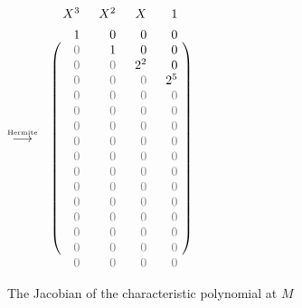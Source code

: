 \documentclass[11pt]{article}
\numberwithin{equation}{section}
\numberwithin{figure}{section}
\theoremstyle{definition}
\begin{document}
\begin{figure}
{\quad $\stackrel{\text{\tiny Hermite}}{\longrightarrow}$ \quad
$\begin{array}{c@{}r@{\hspace{1.5em}}r@{\hspace{1.5em}}r@{\hspace{1.5em}}r@{\hspace{0.5ex}}c}
& X^3 & X^2 & X & 1 \\
\rule[3ex]{0pt}{\baselineskip}
\raisebox{0.2ex}{\multirow{16}{*}{$\left(\parbox[c][39ex]{0cm}{}\right.$}}
& 1 & 0 & 0 & 0 &
\raisebox{0.2ex}{\multirow{16}{*}{$\left.\parbox[c][39ex]{0cm}{}\right)$}} \\
&{\color{black!50} 0} & 1 & 0 & 0 \\
&{\color{black!50} 0} & {\color{black!50} 0} & 2^2 & 0 \\
&{\color{black!50} 0} & {\color{black!50} 0} & {\color{black!50} 0} & 2^5 \\
&{\color{black!50} 0} & {\color{black!50} 0} & {\color{black!50} 0} & {\color{black!50} 0} \\
&{\color{black!50} 0} & {\color{black!50} 0} & {\color{black!50} 0} & {\color{black!50} 0} \\
&{\color{black!50} 0} & {\color{black!50} 0} & {\color{black!50} 0} & {\color{black!50} 0} \\
&{\color{black!50} 0} & {\color{black!50} 0} & {\color{black!50} 0} & {\color{black!50} 0} \\
&{\color{black!50} 0} & {\color{black!50} 0} & {\color{black!50} 0} & {\color{black!50} 0} \\
&{\color{black!50} 0} & {\color{black!50} 0} & {\color{black!50} 0} & {\color{black!50} 0} \\
&{\color{black!50} 0} & {\color{black!50} 0} & {\color{black!50} 0} & {\color{black!50} 0} \\
&{\color{black!50} 0} & {\color{black!50} 0} & {\color{black!50} 0} & {\color{black!50} 0} \\
&{\color{black!50} 0} & {\color{black!50} 0} & {\color{black!50} 0} & {\color{black!50} 0} \\
&{\color{black!50} 0} & {\color{black!50} 0} & {\color{black!50} 0} & {\color{black!50} 0} \\
&{\color{black!50} 0} & {\color{black!50} 0} & {\color{black!50} 0} & {\color{black!50} 0} \\
&{\color{black!50} 0} & {\color{black!50} 0} & {\color{black!50} 0} & {\color{black!50} 0} 
\end{array}$}
\hfill\null

\caption{The Jacobian of the characteristic polynomial at $M$}
\label{fig:jaccharpoly} 
\end{figure} 
\end{document}
